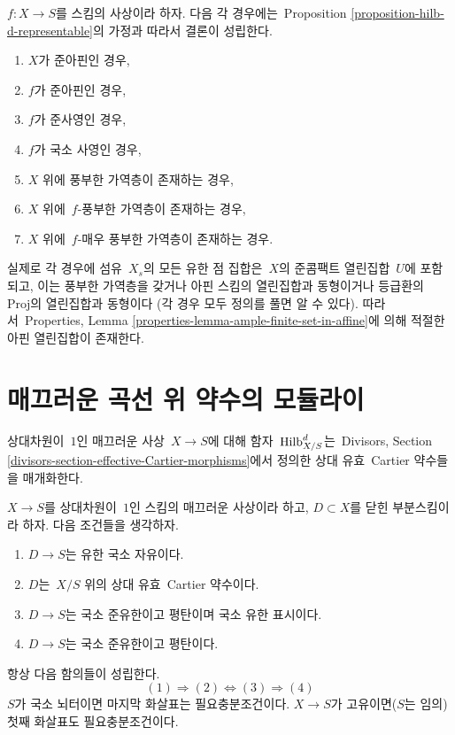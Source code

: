 \begin{remark}
\label{remark-when-proposition-applies}
$f : X \to S$를 스킴의 사상이라 하자. 다음 각 경우에는\  Proposition
\ref{proposition-hilb-d-representable}의 가정과 따라서 결론이 성립한다.
\begin{enumerate}
\item $X$가 준아핀인 경우,
\item $f$가 준아핀인 경우,
\item $f$가 준사영인 경우,
\item $f$가 국소 사영인 경우,
\item $X$ 위에 풍부한 가역층이 존재하는 경우,
\item $X$ 위에\  $f$-풍부한 가역층이 존재하는 경우,
\item $X$ 위에\  $f$-매우 풍부한 가역층이 존재하는 경우.
\end{enumerate}
실제로 각 경우에 섬유\  $X_s$의 모든 유한 점 집합은\  $X$의 준콤팩트
열린집합\  $U$에 포함되고, 이는 풍부한 가역층을 갖거나 아핀 스킴의
열린집합과 동형이거나 등급환의\  $\text{Proj}$의 열린집합과 동형이다
(각 경우 모두 정의를 풀면 알 수 있다). 따라서\  Properties, Lemma
\ref{properties-lemma-ample-finite-set-in-affine}에 의해 적절한 아핀
열린집합이 존재한다.
\end{remark}




\section{매끄러운 곡선 위 약수의 모듈라이}
\label{section-divisors}

\noindent
상대차원이\  $1$인 매끄러운 사상\  $X \to S$에 대해 함자\ 
$\mathrm{Hilb}^d_{X/S}$는\  Divisors, Section
\ref{divisors-section-effective-Cartier-morphisms}에서 정의한 상대 유효\ 
Cartier 약수들을 매개화한다.

\begin{lemma}
\label{lemma-divisors-on-curves}
$X \to S$를 상대차원이\  $1$인 스킴의 매끄러운 사상이라 하고,
$D \subset X$를 닫힌 부분스킴이라 하자. 다음 조건들을 생각하자.
\begin{enumerate}
\item $D \to S$는 유한 국소 자유이다.
\item $D$는\  $X/S$ 위의 상대 유효\  Cartier 약수이다.
\item $D \to S$는 국소 준유한이고 평탄이며 국소 유한 표시이다.
\item $D \to S$는 국소 준유한이고 평탄이다.
\end{enumerate}
항상 다음 함의들이 성립한다.
$$
(1) \Rightarrow (2) \Leftrightarrow (3) \Rightarrow (4)
$$
$S$가 국소 뇌터이면 마지막 화살표는 필요충분조건이다.
$X \to S$가 고유이면($S$는 임의) 첫째 화살표도 필요충분조건이다.
\end{lemma}


